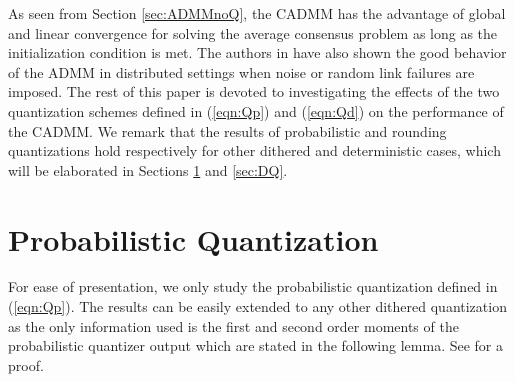 \documentclass[journal]{IEEEtran}
\begin{document}
As seen from Section \ref{sec:ADMMnoQ}, the CADMM has the advantage of global and linear convergence for solving the average consensus problem as long as the initialization condition is met.  The authors in \cite{Zhu2009, Erseghe2011} have also shown the good behavior of the ADMM in distributed settings when noise or random link failures are imposed. The rest of this paper is devoted to investigating the effects of the two quantization schemes defined in (\ref{eqn:Qp}) and (\ref{eqn:Qd}) on the performance of the CADMM. We remark that the results of probabilistic and rounding quantizations hold respectively for other dithered and deterministic cases, which will be elaborated in Sections \ref{sec:PQ} and \ref{sec:DQ}. 




\section{Probabilistic Quantization}
\label{sec:PQ}


For ease of presentation, we only study the probabilistic quantization defined in (\ref{eqn:Qp}). The results can be easily extended to any other dithered quantization as the only information used is the first and second order moments of the probabilistic quantizer output which are stated in the following lemma. See \cite{Xiao2005a} for a proof.
\end{document}
